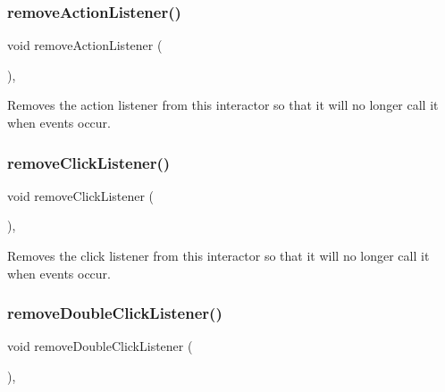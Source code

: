 \subsubsection{\texorpdfstring{remove\+Action\+Listener()}{removeActionListener()}}
{\footnotesize\ttfamily void remove\+Action\+Listener (\begin{DoxyParamCaption}{ }\end{DoxyParamCaption})\hspace{0.3cm}{\ttfamily [virtual]}, {\ttfamily [inherited]}}



Removes the action listener from this interactor so that it will no longer call it when events occur. 

\mbox{\label{classsgl_1_1GInteractor_ad39d0325cde6b97ebda4b9d7787c633b}} 
\subsubsection{\texorpdfstring{remove\+Click\+Listener()}{removeClickListener()}}
{\footnotesize\ttfamily void remove\+Click\+Listener (\begin{DoxyParamCaption}{ }\end{DoxyParamCaption})\hspace{0.3cm}{\ttfamily [virtual]}, {\ttfamily [inherited]}}



Removes the click listener from this interactor so that it will no longer call it when events occur. 

\mbox{\label{classsgl_1_1GInteractor_aa4250907e4cdd77349c04f0cf5cdd3d3}} 
\subsubsection{\texorpdfstring{remove\+Double\+Click\+Listener()}{removeDoubleClickListener()}}
{\footnotesize\ttfamily void remove\+Double\+Click\+Listener (\begin{DoxyParamCaption}{ }\end{DoxyParamCaption})\hspace{0.3cm}{\ttfamily [virtual]}, {\ttfamily [inherited]}}



